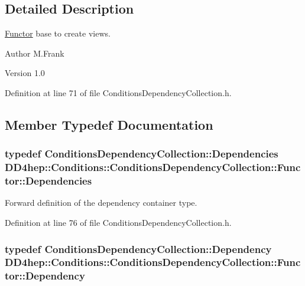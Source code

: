\subsection{Detailed Description}
\hyperlink{class_d_d4hep_1_1_conditions_1_1_conditions_dependency_collection_1_1_functor}{Functor} base to create views. \begin{DoxyAuthor}{Author}
M.Frank 
\end{DoxyAuthor}
\begin{DoxyVersion}{Version}
1.0 
\end{DoxyVersion}


Definition at line 71 of file ConditionsDependencyCollection.h.

\subsection{Member Typedef Documentation}
\hypertarget{class_d_d4hep_1_1_conditions_1_1_conditions_dependency_collection_1_1_functor_adaf7b6e0ec9fa1b67ee3b24924780152}{
\subsubsection[{Dependencies}]{\setlength{\rightskip}{0pt plus 5cm}typedef {\bf ConditionsDependencyCollection::Dependencies} {\bf DD4hep::Conditions::ConditionsDependencyCollection::Functor::Dependencies}}}
\label{class_d_d4hep_1_1_conditions_1_1_conditions_dependency_collection_1_1_functor_adaf7b6e0ec9fa1b67ee3b24924780152}


Forward definition of the dependency container type. 

Definition at line 76 of file ConditionsDependencyCollection.h.\hypertarget{class_d_d4hep_1_1_conditions_1_1_conditions_dependency_collection_1_1_functor_af969f8adeb10039bf5d5d2b2751fc45b}{
\subsubsection[{Dependency}]{\setlength{\rightskip}{0pt plus 5cm}typedef {\bf ConditionsDependencyCollection::Dependency} {\bf DD4hep::Conditions::ConditionsDependencyCollection::Functor::Dependency}}}
\label{class_d_d4hep_1_1_conditions_1_1_conditions_dependency_collection_1_1_functor_af969f8adeb10039bf5d5d2b2751fc45b}



